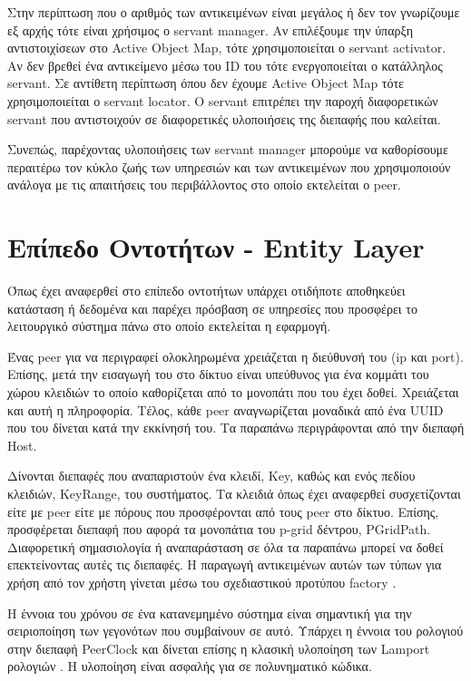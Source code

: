 Στην περίπτωση που ο αριθμός των αντικειμένων είναι μεγάλος ή δεν τον 
γνωρίζουμε εξ αρχής τότε είναι χρήσιμος ο servant manager. Αν επιλέξουμε 
την ύπαρξη αντιστοιχίσεων στο Active Object Map, τότε χρησιμοποιείται ο 
servant activator. Αν δεν βρεθεί ένα αντικείμενο μέσω του ID του τότε 
ενεργοποιείται ο κατάλληλος servant. Σε αντίθετη περίπτωση όπου δεν 
έχουμε Active Object Map τότε χρησιμοποιείται ο servant locator. Ο 
servant επιτρέπει την παροχή διαφορετικών servant που αντιστοιχούν σε 
διαφορετικές υλοποιήσεις της διεπαφής που καλείται.

Συνεπώς, παρέχοντας υλοποιήσεις των servant manager μπορούμε να 
καθορίσουμε περαιτέρω τον κύκλο ζωής των υπηρεσιών και των αντικειμένων 
που χρησιμοποιούν ανάλογα με τις απαιτήσεις του περιβάλλοντος στο οποίο 
εκτελείται ο peer.

\section{Επίπεδο Οντοτήτων - Entity Layer}

Όπως έχει αναφερθεί στο επίπεδο οντοτήτων υπάρχει οτιδήποτε 
αποθηκεύει κατάσταση ή δεδομένα και παρέχει πρόσβαση σε υπηρεσίες που 
προσφέρει το λειτουργικό σύστημα πάνω στο οποίο εκτελείται η εφαρμογή.

Ένας peer για να περιγραφεί ολοκληρωμένα χρειάζεται η διεύθυνσή 
του (ip και port). Επίσης, μετά την εισαγωγή του στο δίκτυο είναι 
υπεύθυνος για ένα κομμάτι του χώρου κλειδιών το οποίο καθορίζεται από το 
μονοπάτι που του έχει δοθεί. Χρειάζεται και αυτή η πληροφορία. Τέλος, 
κάθε peer αναγνωρίζεται μοναδικά από ένα UUID που του δίνεται κατά την 
εκκίνησή του. Τα παραπάνω περιγράφονται από την διεπαφή Host.

Δίνονται διεπαφές που αναπαριστούν ένα κλειδί, Key, καθώς και ενός 
πεδίου κλειδιών, KeyRange, του συστήματος. Τα κλειδιά όπως έχει 
αναφερθεί συσχετίζονται είτε με peer είτε με πόρους που προσφέρονται από 
τους peer στο δίκτυο. Επίσης, προσφέρεται διεπαφή που αφορά τα μονοπάτια 
του p-grid δέντρου, PGridPath. Διαφορετική σημασιολογία ή αναπαράσταση 
σε όλα τα παραπάνω μπορεί να δοθεί επεκτείνοντας αυτές τις διεπαφές. Η 
παραγωγή αντικειμένων αυτών των τύπων για χρήση από τον χρήστη γίνεται 
μέσω του σχεδιαστικού προτύπου factory \citep{GoF}.

Η έννοια του χρόνου σε ένα κατανεμημένο σύστημα είναι σημαντική για την 
σειριοποίηση των γεγονότων που συμβαίνουν σε αυτό. Υπάρχει η έννοια του 
ρολογιού στην διεπαφή PeerClock και δίνεται επίσης η κλασική υλοποίηση 
των Lamport ρολογιών \citep{Lamport}. Η υλοποίηση είναι ασφαλής για σε 
πολυνηματικό κώδικα.

